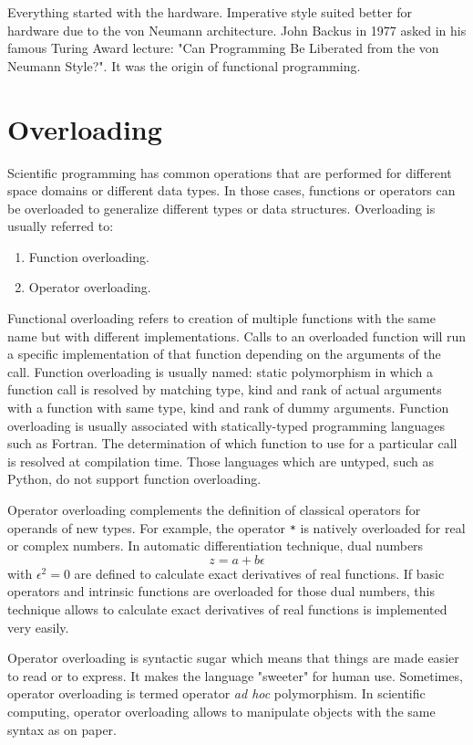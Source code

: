 Everything started with the hardware.
Imperative style suited better for hardware due to the von Neumann architecture. 
John Backus in 1977 asked in his famous Turing Award lecture:
 "Can Programming Be Liberated from the von Neumann Style?". 
 It was the origin of functional programming. 


\newpage 
\section{Overloading} 
Scientific programming has common operations that are performed for different 
space domains or different data types. In those cases, functions or operators can be  overloaded 
to generalize different types or data structures.  
Overloading is usually referred to:  
\begin{enumerate}
\item Function overloading.
\item Operator overloading.
\end{enumerate}
Functional overloading refers to creation of multiple functions with the same name but with different implementations. 
Calls to an overloaded function will run a 
specific implementation of that function depending on the arguments of the call. 
Function overloading is usually named: static polymorphism in which a function call is resolved by matching 
type, kind and rank of actual arguments with a function with same type, kind and rank of dummy arguments.
Function overloading is usually associated with statically-typed programming languages such as Fortran. 
The determination of which function to use for a particular call is resolved at compilation time.
Those languages which are untyped, such as Python, do not support function overloading. 


Operator overloading complements the definition of classical operators for operands of new types. 
For example, the operator \verb|*| is natively overloaded for real or complex numbers. 
In automatic differentiation technique, dual numbers 
$$ z = a + b \epsilon
$$ 
with $\epsilon^2=0$ 
are defined to calculate exact derivatives of real functions. 
If basic operators and intrinsic functions are overloaded for those dual numbers, 
this technique allows to calculate 
exact derivatives of real functions is implemented very easily. 

Operator overloading is syntactic sugar which means that things are made easier to read or to express.
It makes the language "sweeter" for human use.
Sometimes, operator overloading is termed operator {\it ad hoc} polymorphism.
In scientific computing, operator overloading allows to manipulate objects with the same syntax as on paper.



